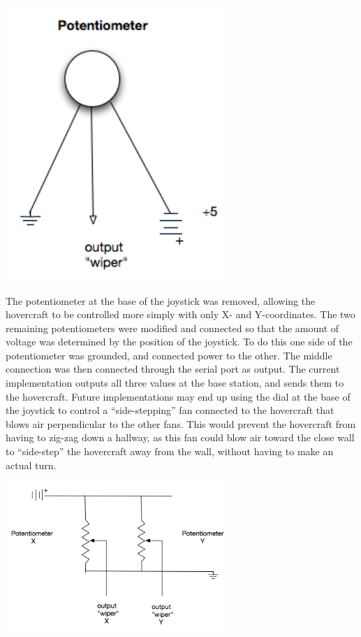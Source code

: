 \begin{minipage}{6.5in}
\begin{center}
  \includegraphics[width=85mm]{imageSources/joystickPotentiometer.png}
\end{center}
\label{joystickPotentiometer}
\end{minipage}

The potentiometer at the base of the joystick was removed, allowing the hovercraft to be controlled more simply with only X- and Y-coordinates. The two remaining potentiometers were modified and connected so that the amount of voltage was determined by the position of the joystick. To do this one side of the potentiometer was grounded, and connected power to the other. The middle connection was then connected through the serial port as output. The current implementation outputs all three values at the base station, and sends them to the hovercraft. Future implementations may end up using the dial at the base of the joystick to control a ``side-stepping'' fan connected to the hovercraft that blows air perpendicular to the other fans. This would prevent the hovercraft from having to zig-zag down a hallway, as this fan could blow air toward the close wall to ``side-step'' the hovercraft away from the wall, without having to make an actual turn.

\begin{minipage}{6.5in}
\begin{center}
  \includegraphics[width=85mm]{imageSources/potentiometerSchematic.png}
\end{center}
\label{potentiometerSchematic}
\end{minipage}

